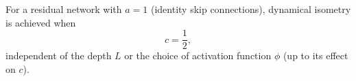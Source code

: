 \begin{corollary}\label{cor:dynamical-isometry}
For a residual network with $a = 1$ (identity skip connections), dynamical isometry is achieved when
\begin{equation}
c = \frac{1}{2},
\end{equation}
independent of the depth $L$ or the choice of activation function $\phi$ (up to its effect on $c$).
\end{corollary}
